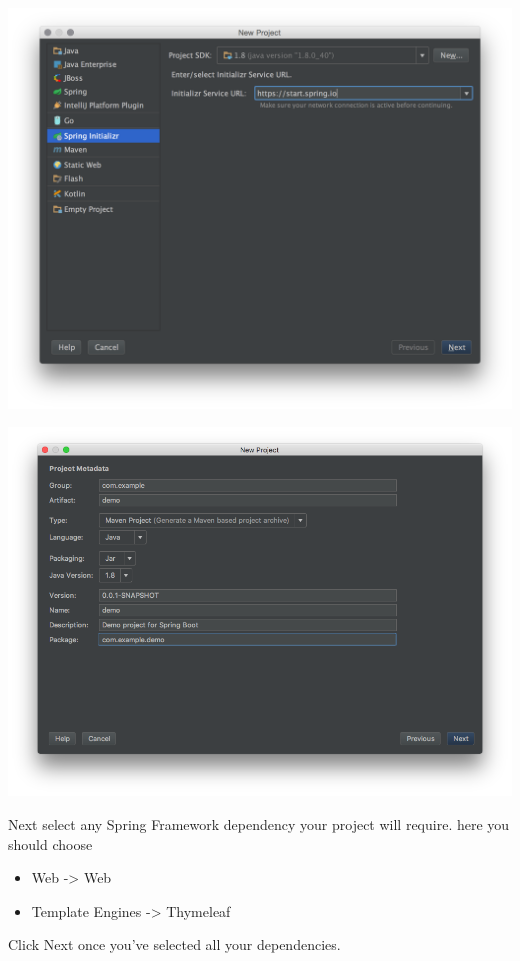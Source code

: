 \includegraphics{rsc/2.png}

\includegraphics{rsc/3.png}

Next select any Spring Framework dependency your project will require.
here you should choose

\begin{itemize}
\tightlist
\item
  Web -\textgreater{} Web
\item
  Template Engines -\textgreater{} Thymeleaf
\end{itemize}

Click Next once you've selected all your dependencies.

